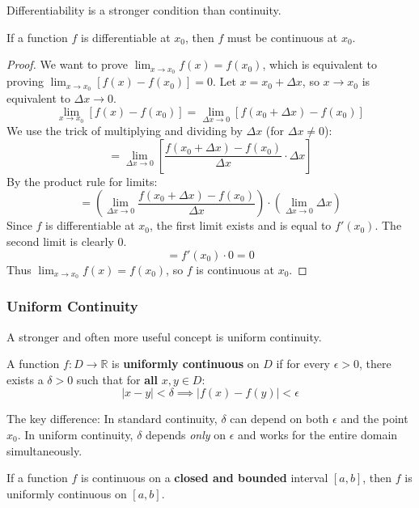 Differentiability is a stronger condition than continuity.

\begin{theorem}
If a function $f$ is differentiable at $x_0$, then $f$ must be continuous at $x_0$.
\end{theorem}

\begin{proof}
We want to prove $\lim_{x \to x_0} f(x) = f(x_0)$, which is equivalent to proving $\lim_{x \to x_0} [f(x) - f(x_0)] = 0$.
Let $x = x_0 + \Delta x$, so $x \to x_0$ is equivalent to $\Delta x \to 0$.
\[
\lim_{x \to x_0} [f(x) - f(x_0)] = \lim_{\Delta x \to 0} [f(x_0 + \Delta x) - f(x_0)]
\]
We use the trick of multiplying and dividing by $\Delta x$ (for $\Delta x \neq 0$):
\[
= \lim_{\Delta x \to 0} \left[ \frac{f(x_0 + \Delta x) - f(x_0)}{\Delta x} \cdot \Delta x \right]
\]
By the product rule for limits:
\[
= \left( \lim_{\Delta x \to 0} \frac{f(x_0 + \Delta x) - f(x_0)}{\Delta x} \right) \cdot \left( \lim_{\Delta x \to 0} \Delta x \right)
\]
Since $f$ is differentiable at $x_0$, the first limit exists and is equal to $f'(x_0)$. The second limit is clearly $0$.
\[
= f'(x_0) \cdot 0 = 0
\]
Thus $\lim_{x \to x_0} f(x) = f(x_0)$, so $f$ is continuous at $x_0$.
\end{proof}
\subsubsection{Uniform Continuity}
A stronger and often more useful concept is uniform continuity.

\begin{definition}
A function $f: D \to \mathbb{R}$ is \textbf{uniformly continuous} on $D$ if for every $\epsilon > 0$, there exists a $\delta > 0$ such that for \textbf{all} $x, y \in D$:
\[ |x - y| < \delta \implies |f(x) - f(y)| < \epsilon \]
\end{definition}

The key difference: In standard continuity, $\delta$ can depend on both $\epsilon$ and the point $x_0$. In uniform continuity, $\delta$ depends \emph{only} on $\epsilon$ and works for the entire domain simultaneously.

\begin{theorem}
If a function $f$ is continuous on a \textbf{closed and bounded} interval $[a, b]$, then $f$ is uniformly continuous on $[a, b]$.
\end{theorem}


